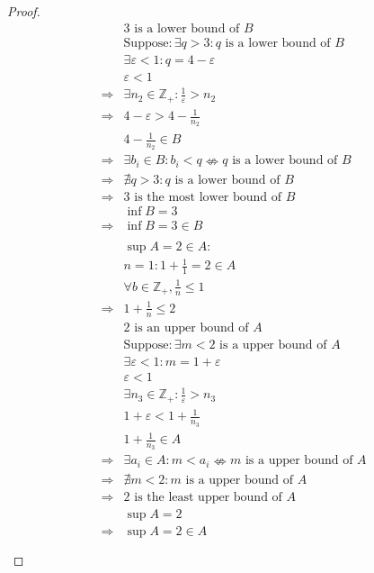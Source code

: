\documentclass{article}
\begin{document}
\begin{proof}
\begin{align*}
        &3\text{ is a lower bound of }B\\
        &\text{Suppose}: \exists q>3: q\text{ is a lower bound of }B\\
        &\exists \varepsilon<1:q=4-\varepsilon\\
        &\varepsilon<1\\
        \Rightarrow&\exists n_2\in\mathbb{Z} _+:\frac{1}{\varepsilon}>n_2\\
        \Rightarrow&4-\varepsilon>4-\frac{1}{n_2}\\
        &4-\frac{1}{n_2}\in B\\
        \Rightarrow&\exists b_i\in B:b_i<q\nLeftrightarrow q\text{ is a lower bound of }B\\
        \Rightarrow&\nexists q>3:q\text{ is a lower bound of }B\\
        \Rightarrow&3\text{ is the most lower bound of }B\\
        &\inf B=3\\
        \Rightarrow&\inf B=3\in B\\
        &\\
        & \sup A=2\in A:\\
        &n=1:1+\frac{1}{1}=2\in A\\
        &\forall b\in\mathbb{Z} _+,\frac{1}{n}\leqslant 1\\
        \Rightarrow&1+\frac{1}{n}\leqslant 2\\
        &2\text{ is an upper bound of }A\\
        &\text{Suppose}:\exists m<2\text{ is a upper bound of }A\\
        &\exists \varepsilon<1:m=1+\varepsilon\\
        &\varepsilon<1\\
        &\exists n_3\in\mathbb{Z} _+:\frac{1}{\varepsilon}>n_3\\
        &1+\varepsilon<1+\frac{1}{n_3}\\
        &1+\frac{1}{n_3}\in A\\
        \Rightarrow&\exists a_i\in A:m<a_i\nLeftrightarrow m\text{ is a upper bound of }A\\
        \Rightarrow&\nexists m<2:m\text{ is a upper bound of }A\\
        \Rightarrow&2\text{ is the least upper bound of }A\\
        &\sup A=2\\
        \Rightarrow&\sup A=2\in A\\
        &\\

\end{align*}
\end{proof}
\end{document}
